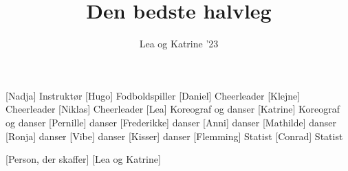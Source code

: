 \documentclass[a4paper,11pt]{article}
\title{Den bedste halvleg}
\author{Lea og Katrine '23}
\begin{document}
\maketitle

\begin{roles}
[Nadja] Instruktør
[Hugo] Fodboldspiller
[Daniel] Cheerleader
[Klejne] Cheerleader
[Niklas] Cheerleader
[Lea] Koreograf og danser
[Katrine] Koreograf og danser
[Pernille] danser
[Frederikke] danser
[Anni] danser
[Mathilde] danser
[Ronja] danser
[Vibe] danser
[Kisser] danser
[Flemming] Statist
[Conrad] Statist

\end{roles}

\begin{props}
[Person, der skaffer]
[Lea og Katrine]
\end{props}


\begin{sketch}






\end{sketch}
\end{document}
